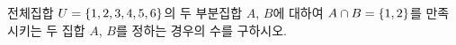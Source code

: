 전체집합 $U=\{1{,}\mkern3mu\mathopen{}2{,}\mkern3mu\mathopen{}3{,}\mkern3mu\mathopen{}4{,}\mkern3mu\mathopen{}5{,}\mkern3mu\mathopen{}6\}$의 두 부분집합 $A$, $B$에 대하여 $A\cap B=\{1{,}\mkern3mu\mathopen{}2\}$를 만족시키는 두 집합 $A$, $B$를 정하는 경우의 수를 구하시오.
